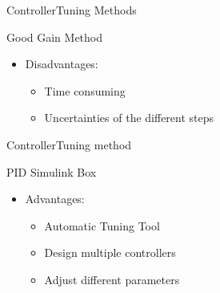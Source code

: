 \begin{frame}{Controller}{Tuning Methods}
  \begin{block}{Good Gain Method}
  
	 \begin{itemize}
	  	\item Disadvantages:
	  \begin{itemize}
	  	\item Time consuming
	  	\item Uncertainties of the different steps	  	
	  \end{itemize}
	\end{itemize}
  
  \end{block}
\end{frame}


\begin{frame}{Controller}{Tuning method}
  \begin{block}{PID Simulink Box}

	  \begin{itemize}
	  \item Advantages:
	  \begin{itemize}
	  	\item Automatic Tuning Tool
	  	\item Design multiple controllers
	  	\item Adjust different parameters  	
	  \end{itemize}
	  \end{itemize}

  \end{block}
\end{frame}

